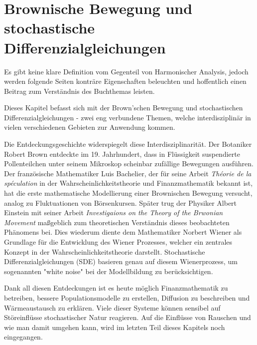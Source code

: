 %
%
%
%
\chapter{Brownische Bewegung und stochastische Differenzialgleichungen\label{chapter:brown}}
\begin{refsection}

Es gibt keine klare Definition vom Gegenteil von Harmonischer Analysis, jedoch werden folgende Seiten konträre Eigenschaften beleuchten und hoffentlich einen Beitrag zum Verständnis des Buchthemas leisten.


Dieses Kapitel befasst sich mit der Brown'schen Bewegung und stochastischen Differenzialgleichungen - zwei eng verbundene Themen, welche interdisziplinär in vielen verschiedenen Gebieten zur Anwendung kommen.

Die Entdeckungsgeschichte widerspiegelt diese Interdisziplinarität. Der Botaniker Robert Brown entdeckte im 19. Jahrhundert, dass in Flüssigkeit suspendierte Pollenteilchen unter seinem Mikroskop scheinbar zufällige Bewegungen ausführen. Der französische Mathematiker Luis Bachelier, der für seine Arbeit \glqq \textit{Théorie de la spéculation}\glqq{} in der Wahrscheinlichkeitstheorie und Finanzmathematik bekannt ist, hat die erste mathematische Modellierung einer Brownischen Bewegung versucht, analog zu Fluktuationen von Börsenkursen. Später trug der Physiker Albert Einstein mit seiner Arbeit \glqq \textit{Investigaions on the Theory of the Brwonian Movement}\glqq{} maßgeblich zum theoretischen Verständnis dieses beobachteten Phänomens bei. Dies wiederum diente dem Mathematiker Norbert Wiener als Grundlage für die Entwicklung des Wiener Prozesses, welcher ein zentrales Konzept in der Wahrscheinlichkeitstheorie darstellt. Stochastische Differenzialgleichungen (SDE) basieren genau auf diesem Wienerprozess, um sogenannten "white noise" bei der Modellbildung zu berücksichtigen. 

Dank all diesen Entdeckungen ist es heute möglich Finanzmathematik zu betreiben, bessere Populationsmodelle zu erstellen, Diffusion zu beschreiben und Wärmeaustausch zu erklären. Viele dieser Systeme können sensibel auf Störeinflüsse stochastischer Natur reagieren. Auf die Einflüsse von Rauschen und wie man damit umgehen kann, wird im letzten Teil dieses Kapitels noch eingegangen.



\end{refsection}
